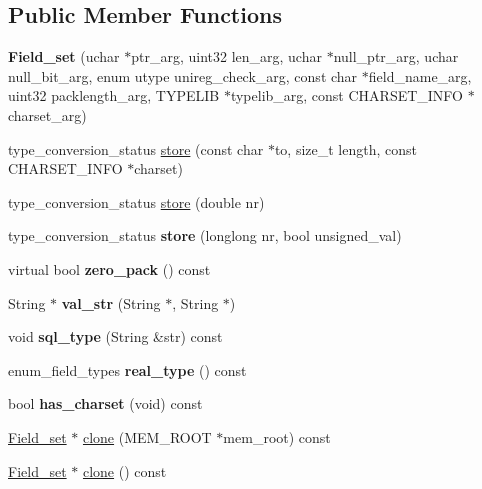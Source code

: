 \subsection*{Public Member Functions}
\begin{DoxyCompactItemize}
\item 
\mbox{\label{classField__set_a1edab03e2aac6e8a0b7f9f29ccb269e9}} 
{\bfseries Field\+\_\+set} (uchar $\ast$ptr\+\_\+arg, uint32 len\+\_\+arg, uchar $\ast$null\+\_\+ptr\+\_\+arg, uchar null\+\_\+bit\+\_\+arg, enum utype unireg\+\_\+check\+\_\+arg, const char $\ast$field\+\_\+name\+\_\+arg, uint32 packlength\+\_\+arg, T\+Y\+P\+E\+L\+IB $\ast$typelib\+\_\+arg, const C\+H\+A\+R\+S\+E\+T\+\_\+\+I\+N\+FO $\ast$charset\+\_\+arg)
\item 
type\+\_\+conversion\+\_\+status \mbox{\hyperlink{classField__set_a2c74d155d4d11aac75bba6b93a08cbb3}{store}} (const char $\ast$to, size\+\_\+t length, const C\+H\+A\+R\+S\+E\+T\+\_\+\+I\+N\+FO $\ast$charset)
\item 
type\+\_\+conversion\+\_\+status \mbox{\hyperlink{classField__set_a58b1852786b3bfe85a3cd2dd7edbfaf2}{store}} (double nr)
\item 
\mbox{\label{classField__set_a800603fd8101ed5cf80d899f1690c26d}} 
type\+\_\+conversion\+\_\+status {\bfseries store} (longlong nr, bool unsigned\+\_\+val)
\item 
\mbox{\label{classField__set_a194653d3227b980f61af1220579228a6}} 
virtual bool {\bfseries zero\+\_\+pack} () const
\item 
\mbox{\label{classField__set_a97ea9663dcc0c28fc8c27500b4888c43}} 
String $\ast$ {\bfseries val\+\_\+str} (String $\ast$, String $\ast$)
\item 
\mbox{\label{classField__set_af406cfb38882aafc90ccaa8843041771}} 
void {\bfseries sql\+\_\+type} (String \&str) const
\item 
\mbox{\label{classField__set_a0d43657ddc0f1212d8e558478cc07c38}} 
enum\+\_\+field\+\_\+types {\bfseries real\+\_\+type} () const
\item 
\mbox{\label{classField__set_a2facd089efe59d4dd0f69de165d4b86e}} 
bool {\bfseries has\+\_\+charset} (void) const
\item 
\mbox{\hyperlink{classField__set}{Field\+\_\+set}} $\ast$ \mbox{\hyperlink{classField__set_a6fa7de649f03776a9047b06bc404cee4}{clone}} (M\+E\+M\+\_\+\+R\+O\+OT $\ast$mem\+\_\+root) const
\item 
\mbox{\hyperlink{classField__set}{Field\+\_\+set}} $\ast$ \mbox{\hyperlink{classField__set_a06dc1b03bfa20901a62f344d66374f65}{clone}} () const
\end{DoxyCompactItemize}
